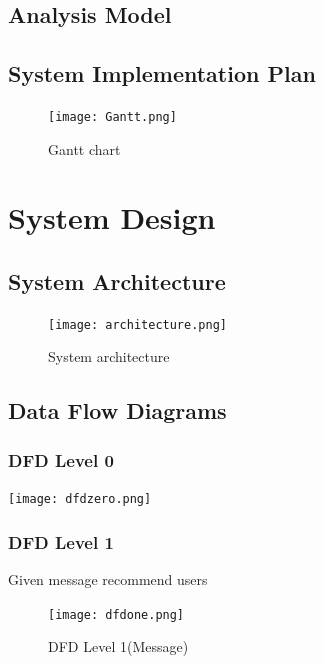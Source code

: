 \documentclass[oneside,a4paper,12pt, times]{book}
\begin{document}










\section{Analysis Model} 


\section{System Implementation Plan} 
\begin{figure}[h]
    \centering
    \texttt{[image: Gantt.png]}
    \caption{Gantt chart}
    \label{fig:my_label}
\end{figure}

\chapter{System Design}
\section{System Architecture}
\begin{figure}[h]
    \centering
     \texttt{[image: architecture.png]}
    \caption{System architecture}
    \label{fig:my_label}
\end{figure}


\newpage
\section{Data Flow Diagrams}
 \subsection{DFD Level 0}
 \begin{center}
     \centering
     \texttt{[image: dfdzero.png]}
     \label{fig:my_label}
 \end{center}
    
   
\subsection{DFD Level 1}
\vskip 1cm
Given message recommend users
\begin{figure}[h]
    \centering
\texttt{[image: dfdone.png]}    \caption{DFD Level 1(Message)}
    \label{fig:my_label}
\end{figure}
    
\end{document}
